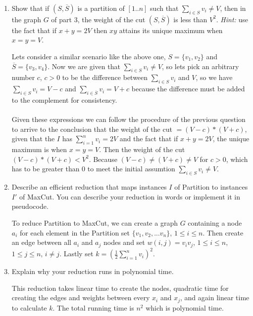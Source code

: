 \documentclass[11pt]{article}
\def\question#1{\red{#1}}
\def\soln#1{\par\blu{#1}} %
\def\blu#1{{\color{blu}#1}}
\def\red#1{{\color{red}#1}}
\begin{document}
\begin{enumerate}
\item \question{Show that if $(S, \overline{S})$ is a partition of $[1..n]$ such that
$\sum_{i\in S} v_i \neq V$, then in the graph $G$ of part 3, the weight of the cut $(S,\overline{S})$
is less than $V^2$.}
\emph{Hint:} use the fact that if $x + y = 2V$ then $x y$ attains its unique maximum
when $x = y = V$.
\soln{
   Lets consider a similar scenario like the above one, $S = \{ v_1, v_2 \}$ and $\overline{S} = \{ v_3, v_4\}$.
   Now we are given that $\sum_{i\in S} v_i \neq V$, so lets pick an arbitrary number $c$, $c>0$ to be the 
   difference between $\sum_{i\in S} v_i$ and $V$, so we have $\sum_{i\in S} v_i = V - c$ and 
   $\sum_{i\in \overline{S}} v_i = V + c$ because the difference must be added to the complement for 
   consistency. \\ \\
   Given these expressions we can follow the procedure of the previous question to arrive to the 
   conclusion that the weight of the cut $= (V-c)*(V+c)$, given that the $I$ has $\sum_{i=1}^n v_i = 2V$ 
   and the fact that if $x + y = 2V$, the unique maximum is when $x = y = V$. Then the weight of the 
   cut  $(V-c)*(V+c) < V^2$. Because $(V-c) \neq (V+c) \neq V$ for $c > 0$, which has to be greater 
   than 0 to meet the initial assumtion $\sum_{i\in S} v_i \neq V$.
}

\item \question{Describe an efficient reduction that maps instances $I$ of Partition to instances $I'$ 
of MaxCut.}
You can describe your reduction in words or implement it in pseudocode.
\soln{
   To reduce Partition to MaxCut, we can create a graph $G$ containing a node $a_i$ for each element in the Partition set 
   $\{v_1,v_2,...v_n\}$, $1 \leq i \leq n$. Then create an edge between all $a_i$ and $a_j$ nodes 
   and set $w(i,j) = v_i v_j$, $1 \leq i \leq n$, $1 \leq j \leq n$, $i \neq j$. Lastly set 
   $k = ( \frac{1}{2} \sum_{i=1}^n v_i)^2$.
}

\item \question{Explain why your reduction runs in polynomial time.}
\soln{
   This reduction takes linear time to create the nodes, quadratic time for creating 
   the edges and weights between every $x_i$ and $x_j$, and again linear time to calculate $k$. 
   The total running time is $n^2$ which is polynomial time. 
}


\end{enumerate}
\end{document}
